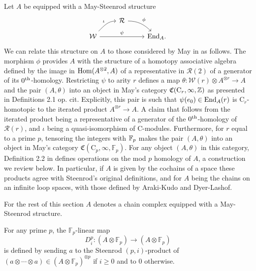 Let $A$ be equipped with a May-Steenrod structure
\begin{equation*}
\begin{tikzcd}[column sep = normal, row sep = small]
& \mathcal R \arrow[dr, "\phi", out=0] & \\
\mathcal W \arrow[ur, "\iota", in=180] \arrow[rr, "\psi"] & & \End_A.
\end{tikzcd}
\end{equation*}
We can relate this structure on $A$ to those considered by May in \cite{may70generalapproach} as follows.
The morphism $\phi$ provides $A$ with the structure of a homotopy associative algebra defined by the image in $\mathrm{Hom}(A^{\otimes 2}, A)$ of a representative in $\mathcal R(2)$ of a generator of its $0^{\mathrm{th}}$-homology.
Restricting $\psi$ to arity $r$ defines a map $\theta \colon \mathcal W(r) \otimes A^{\otimes r} \to A$ and the pair $(A, \theta)$ into an object in May's category $\mathfrak{C}(\mathrm C_r, \infty, \mathbb{Z})$ as presented in Definitions 2.1 op. cit.
Explicitly, this pair is such that $\psi(e_0) \in \mathrm{End}_A(r)$ is $\mathrm C_r$-homotopic to the iterated product $A^{\otimes r} \to A$.
A claim that follows from the iterated product being a representative of a generator of the $0^{\mathrm{th}}$-homology of $\mathcal R(r)$, and $\iota$ being a quasi-isomorphism of $\mathrm C$-modules.
Furthermore, for $r$ equal to a prime $p$, tensoring the integers with $\mathbb{F}_p$ makes the pair $(A, \theta)$ into an object in May's category $\mathfrak{C}(\mathrm C_p, \infty, \mathbb{F}_p)$.
For any object $(A, \theta)$ in this category, Definition 2.2 in \cite{may70generalapproach} defines operations on the mod $p$ homology of $A$, a construction we review below.
In particular, if $A$ is given by the cochains of a space these products agree with Steenrod's original definitions, and for $A$ being the chains on an infinite loop spaces, with those defined by Araki-Kudo and Dyer-Lashof.

For the rest of this section $A$ denotes a chain complex equipped with a May-Steenrod structure.

\begin{definition}
	For any prime $p$, the $\mathbb{F}_p$-linear map
	\begin{equation*}
	D^p_i \colon (A \otimes \mathbb{F}_p) \to (A \otimes \mathbb{F}_p)
	\end{equation*}
	is defined by sending $a$ to the Steenrod \mbox{$(p, i)$-product} of $(a \otimes \cdots \otimes a) \in (A \otimes \mathbb{F}_p)^{\otimes p}$ if $i \geq 0$ and to $0$ otherwise.
\end{definition}

